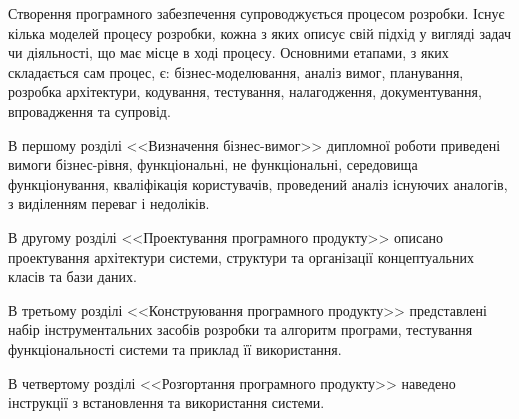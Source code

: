 \begin{sloppy}
Створення програмного забезпечення супроводжується процесом розробки. Існує кілька моделей процесу розробки, кожна з яких описує свій підхід у вигляді задач чи діяльності, що має місце в ході процесу. Основними етапами, з яких складається сам процес, є: бізнес-моделювання, аналіз вимог, планування, розробка архітектури, кодування, тестування, налагодження, документування, впровадження та супровід.

В першому розділі <<Визначення бізнес-вимог>> дипломної роботи приведені вимоги бізнес-рівня, функціональні, не функціональні, середовища функціонування, кваліфікація користувачів, проведений аналіз існуючих аналогів, з виділенням  переваг і недоліків.

В другому розділі <<Проектування програмного продукту>> описано проектування архітектури системи, структури та організації концептуальних класів та бази даних.

В третьому розділі <<Конструювання програмного продукту>> представлені набір інструментальних засобів розробки та алгоритм програми, тестування функціональності системи та приклад її використання.

В четвертому розділі <<Розгортання програмного продукту>> наведено інструкції з встановлення та використання системи.
\end{sloppy}

